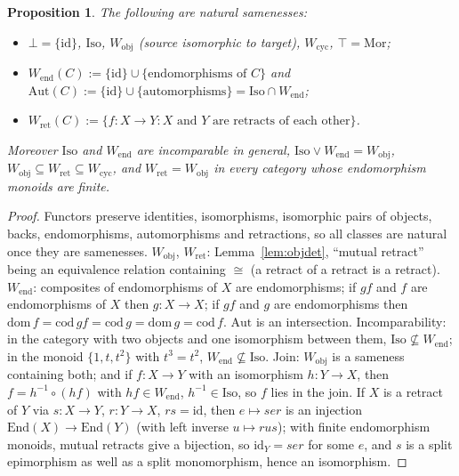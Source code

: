 \documentclass[11pt]{amsart}
\newtheorem{prop}[thm]{Proposition}
\theoremstyle{definition}
\newcommand{\Mor}{\mathrm{Mor}}
\newcommand{\Iso}{\mathrm{Iso}}
\newcommand{\Aut}{\mathrm{Aut}}
\newcommand{\End}{\mathrm{End}}
\newcommand{\Wcyc}{W_{\mathrm{cyc}}}
\newcommand{\Wobj}{W_{\mathrm{obj}}}
\newcommand{\Wend}{W_{\mathrm{end}}}
\newcommand{\Wret}{W_{\mathrm{ret}}}
\begin{document}
\begin{prop}\label{prop:naturals}
The following are natural samenesses:
\begin{itemize}
\item $\bot=\{\mathrm{id}\}$, $\Iso$, $\Wobj$ (source isomorphic to target), $\Wcyc$,
$\top=\Mor$;
\item $\Wend(C):=\{\mathrm{id}\}\cup\{\text{endomorphisms of }C\}$ and
$\Aut(C):=\{\mathrm{id}\}\cup\{\text{automorphisms}\}=\Iso\cap\Wend$;
\item $\Wret(C):=\{f\colon X\to Y: X\text{ and }Y\text{ are retracts of each other}\}$.
\end{itemize}
Moreover $\Iso$ and $\Wend$ are incomparable in general, $\Iso\vee\Wend=\Wobj$,
$\Wobj\subseteq\Wret\subseteq\Wcyc$, and $\Wret=\Wobj$ in every category whose
endomorphism monoids are finite.
\end{prop}
\begin{proof}
Functors preserve identities, isomorphisms, isomorphic pairs of objects,
backs, endomorphisms, automorphisms and retractions, so all classes are
natural once they are samenesses. $\Wobj$, $\Wret$: Lemma~\ref{lem:objdet},
``mutual retract'' being an equivalence relation containing $\cong$ (a retract
of a retract is a retract). $\Wend$: composites of endomorphisms of $X$ are
endomorphisms; if $gf$ and $f$ are endomorphisms of $X$ then $g\colon X\to X$;
if $gf$ and $g$ are endomorphisms then $\mathrm{dom}\,f=\mathrm{cod}\,gf=\mathrm{cod}\,g
=\mathrm{dom}\,g=\mathrm{cod}\,f$. $\Aut$ is an intersection. Incomparability: in
the category with two objects and one isomorphism between them,
$\Iso\not\subseteq\Wend$; in the monoid $\{1,t,t^2\}$ with $t^3=t^2$,
$\Wend\not\subseteq\Iso$. Join: $\Wobj$ is a sameness containing both; and if
$f\colon X\to Y$ with an isomorphism $h\colon Y\to X$, then $f=h^{-1}\circ(hf)$ with
$hf\in\Wend$, $h^{-1}\in\Iso$, so $f$ lies in the join. If $X$ is a retract of
$Y$ via $s\colon X\to Y$, $r\colon Y\to X$, $rs=\mathrm{id}$, then $e\mapsto ser$ is an
injection $\End(X)\to\End(Y)$ (with left inverse $u\mapsto rus$); with finite
endomorphism monoids, mutual retracts give a bijection, so
$\mathrm{id}_Y=ser$ for some $e$, and $s$ is a split epimorphism as well as a
split monomorphism, hence an isomorphism.
\end{proof}
\end{document}
